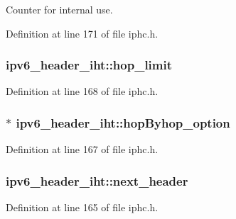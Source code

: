 Counter for internal use. 



Definition at line 171 of file iphc.\+h.

\subsubsection[{\texorpdfstring{hop\+\_\+limit}{hop_limit}}]{ ipv6\+\_\+header\+\_\+iht\+::hop\+\_\+limit}\hypertarget{structipv6__header__iht_a6a1ad31bf1db45f8ca1f087309984f57}{}\label{structipv6__header__iht_a6a1ad31bf1db45f8ca1f087309984f57}


Definition at line 168 of file iphc.\+h.

\subsubsection[{\texorpdfstring{hop\+Byhop\+\_\+option}{hopByhop_option}}]{$\ast$ ipv6\+\_\+header\+\_\+iht\+::hop\+Byhop\+\_\+option}\hypertarget{structipv6__header__iht_a8bc0b0fe214777daf385e87f5ebc3c18}{}\label{structipv6__header__iht_a8bc0b0fe214777daf385e87f5ebc3c18}


Definition at line 167 of file iphc.\+h.

\subsubsection[{\texorpdfstring{next\+\_\+header}{next_header}}]{ ipv6\+\_\+header\+\_\+iht\+::next\+\_\+header}\hypertarget{structipv6__header__iht_af41175a4162c4ad3bd3948be2b21df56}{}\label{structipv6__header__iht_af41175a4162c4ad3bd3948be2b21df56}


Definition at line 165 of file iphc.\+h.

